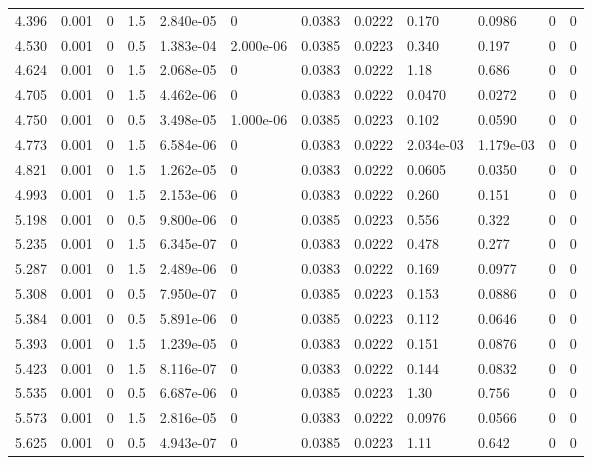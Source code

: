\documentclass[preview]{standalone}
\begin{document}
{{{\begin{tabular}{L{1.2cm}C{1.2cm} C{0.3cm}C{0.5cm} C{1.4cm}C{1.4cm} C{1.4cm}C{1.4cm} C{1.6cm}C{1.6cm} C{1.6cm}C{1.6cm}}
  4.396  &  0.001  & 0     & 1.5 &  2.840e-05  & 0  &  0.0383&   0.0222& 0.170 & 0.0986   &  0 & 0  \\ 
  4.530  &  0.001  & 0     & 0.5 &  1.383e-04  & 2.000e-06  &  0.0385&   0.0223& 0.340 & 0.197   &  0 & 0  \\ 
  4.624  &  0.001  & 0     & 1.5 &  2.068e-05  & 0  &  0.0383&   0.0222& 1.18 & 0.686   &  0 & 0  \\ 
  4.705  &  0.001  & 0     & 1.5 &  4.462e-06  & 0  &  0.0383&   0.0222& 0.0470 & 0.0272   &  0 & 0  \\ 
  4.750  &  0.001  & 0     & 0.5 &  3.498e-05  & 1.000e-06  &  0.0385&   0.0223& 0.102 & 0.0590   &  0 & 0  \\ 
  4.773  &  0.001  & 0     & 1.5 &  6.584e-06  & 0  &  0.0383&   0.0222& 2.034e-03 & 1.179e-03   &  0 & 0  \\ 
  4.821  &  0.001  & 0     & 1.5 &  1.262e-05  & 0  &  0.0383&   0.0222& 0.0605 & 0.0350   &  0 & 0  \\ 
  4.993  &  0.001  & 0     & 1.5 &  2.153e-06  & 0  &  0.0383&   0.0222& 0.260 & 0.151   &  0 & 0  \\ 
  5.198  &  0.001  & 0     & 0.5 &  9.800e-06  & 0  &  0.0385&   0.0223& 0.556 & 0.322   &  0 & 0  \\ 
  5.235  &  0.001  & 0     & 1.5 &  6.345e-07  & 0  &  0.0383&   0.0222& 0.478 & 0.277   &  0 & 0  \\ 
  5.287  &  0.001  & 0     & 1.5 &  2.489e-06  & 0  &  0.0383&   0.0222& 0.169 & 0.0977   &  0 & 0  \\ 
  5.308  &  0.001  & 0     & 0.5 &  7.950e-07  & 0  &  0.0385&   0.0223& 0.153 & 0.0886   &  0 & 0  \\ 
  5.384  &  0.001  & 0     & 0.5 &  5.891e-06  & 0  &  0.0385&   0.0223& 0.112 & 0.0646   &  0 & 0  \\ 
  5.393  &  0.001  & 0     & 1.5 &  1.239e-05  & 0  &  0.0383&   0.0222& 0.151 & 0.0876   &  0 & 0  \\ 
  5.423  &  0.001  & 0     & 1.5 &  8.116e-07  & 0  &  0.0383&   0.0222& 0.144 & 0.0832   &  0 & 0  \\ 
  5.535  &  0.001  & 0     & 0.5 &  6.687e-06  & 0  &  0.0385&   0.0223& 1.30 & 0.756   &  0 & 0  \\ 
  5.573  &  0.001  & 0     & 1.5 &  2.816e-05  & 0  &  0.0383&   0.0222& 0.0976 & 0.0566   &  0 & 0  \\ 
  5.625  &  0.001  & 0     & 0.5 &  4.943e-07  & 0  &  0.0385&   0.0223& 1.11 & 0.642   &  0 & 0  \\ 

\end{tabular}}}}
\end{document}
